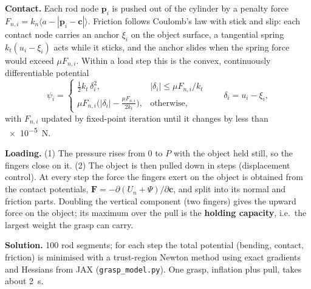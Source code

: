 \documentclass[11pt,a4paper]{article}
\numberwithin{equation}{section}
\begin{document}
\textbf{Contact.} Each rod node $\bm p_i$ is pushed out of the cylinder by a penalty force
$F_{n,i}=k_n\langle a-|\bm p_i-\bm c|\rangle$. Friction follows Coulomb's law with stick and slip: each contact
node carries an anchor $\xi_i$ on the object surface, a tangential spring $k_t(u_i-\xi_i)$ acts while it sticks,
and the anchor slides when the spring force would exceed $\mu F_{n,i}$. Within a load step this is the convex,
continuously differentiable potential
\begin{equation}
\psi_i = \begin{cases} \tfrac12 k_t\,\delta_i^2, & |\delta_i|\le \mu F_{n,i}/k_t\\[2pt]
\mu F_{n,i}\big(|\delta_i| - \tfrac{\mu F_{n,i}}{2k_t}\big), & \text{otherwise,}\end{cases}
\qquad \delta_i = u_i-\xi_i ,
\end{equation}
with $F_{n,i}$ updated by fixed-point iteration until it changes by less than \SI{e-5}{N}.

\textbf{Loading.} (1) The pressure rises from 0 to $P$ with the object held still, so the fingers close on it.
(2) The object is then pulled down in steps (displacement control). At every step the force the fingers exert
on the object is obtained from the contact potentials, $\bm F = -\partial(U_n+\Psi)/\partial\bm c$, and split
into its normal and friction parts. Doubling the vertical component (two fingers) gives the upward force on the
object; its maximum over the pull is the \textbf{holding capacity}, i.e.\ the largest weight the grasp can carry.

\textbf{Solution.} 100 rod segments; for each step the total potential (bending, contact, friction) is minimised
with a trust-region Newton method using exact gradients and Hessians from JAX
(\texttt{grasp\_model.py}). One grasp, inflation plus pull, takes about \SI{2}{s}.
\end{document}
